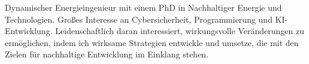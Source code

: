 
\begin{cvparagraph}

Dynamischer Energieingenieur mit einem PhD in Nachhaltiger Energie und Technologien. Großes Interesse an Cybersicherheit, Programmierung und KI-Entwicklung. Leidenschaftlich daran interessiert, wirkungsvolle Veränderungen zu ermöglichen, indem ich wirksame Strategien entwickle und umsetze, die mit den Zielen für nachhaltige Entwicklung im Einklang stehen.

\end{cvparagraph}